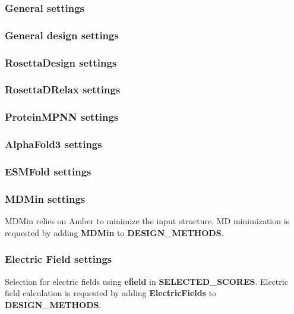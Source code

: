 \documentclass[10pt]{extarticle}
\begin{document}
\subsubsection{General settings}

\subsubsection{General design settings}

\subsubsection{RosettaDesign settings}

\subsubsection{RosettaDRelax settings}

\subsubsection{ProteinMPNN settings}

\subsubsection{AlphaFold3 settings}

\subsubsection{ESMFold settings}

\subsubsection{MDMin settings}

MDMin relies on Amber to minimize the input structure. MD minimization is requested by adding \textbf{MDMin} to \textbf{DESIGN\_METHODS}.



\subsubsection{Electric Field settings}

Selection for electric fields using \textbf{efield} in \textbf{SELECTED\_SCORES}. Electric field calculation is requested by adding \textbf{ElectricFields} to \textbf{DESIGN\_METHODS}.\\
\end{document}
